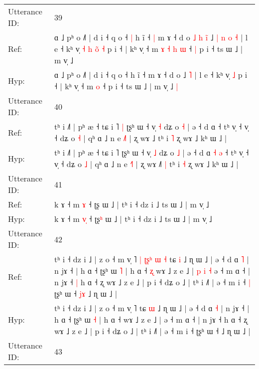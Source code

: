 \documentclass[10pt]{article}
\DeclareRobustCommand{\hl}[1]{{\textcolor{red}{#1}}}
\begin{document}
\begin{longtable}{ll}
 \\
\midrule
Utterance ID: & 39 \\
Ref: & ɑ ˩ pʰ o ˩˥ | d i ˧ q o ˧\hl{ }\hl{|} h ĩ ˧\hl{ }\hl{|} m ɤ ˧ d o\hl{ }\hl{˩}\hl{ }\hl{h}\hl{ }\hl{i}\hl{̃} ˩\hl{ }\hl{|}\hl{ }\hl{n}\hl{ }\hl{o} \hl{˧} | l e ˧ kʰ v̩\hl{ }\hl{˧}\hl{ }\hl{h}\hl{ }\hl{o}\hl{̃} \hl{˧} p i ˧ | kʰ v̩ ˧ m\hl{ }\hl{ɤ}\hl{ }\hl{˧}\hl{ }\hl{h} \hl{ɯ} ˧\hl{ }\hl{|} p i ˧ ts ɯ ˩ | m v̩ ˩\hl{}\hl{}
 \\
Hyp: & ɑ ˩ pʰ o ˩˥ | d i ˧ q o ˧\hl{}\hl{} h ĩ ˧\hl{}\hl{} m ɤ ˧ d o\hl{}\hl{}\hl{}\hl{}\hl{}\hl{}\hl{} ˩\hl{}\hl{}\hl{}\hl{}\hl{}\hl{} \hl{˥} | l e ˧ kʰ v̩\hl{}\hl{}\hl{}\hl{}\hl{}\hl{}\hl{} \hl{˩} p i ˧ | kʰ v̩ ˧ m\hl{}\hl{}\hl{}\hl{}\hl{}\hl{} \hl{o} ˧\hl{}\hl{} p i ˧ ts ɯ ˩ | m v̩ ˩\hl{ }\hl{|}
 \\
\midrule
Utterance ID: & 40 \\
Ref: & tʰ i ˩˥ | pʰ æ ˧ tɕ i ˥\hl{ }\hl{|} ʈʂʰ ɯ ˧ v̩ \hl{˧} dʑ o \hl{˧} | ə ˧ d ɑ\hl{}\hl{}\hl{}\hl{} ˧ tʰ v̩ ˧ v̩ ˧ dʑ o \hl{˧} | qʰ ɑ ˩ n e \hl{˩}˥ | ʐ wɤ ˩\hl{}\hl{}\hl{} tʰ i \hl{˥} ʐ wɤ ˩ kʰ ɯ ˩ |
 \\
Hyp: & tʰ i ˩˥ | pʰ æ ˧ tɕ i ˥\hl{}\hl{} ʈʂʰ ɯ ˧ v̩ \hl{˩} dʑ o \hl{˩} | ə ˧ d ɑ\hl{ }\hl{˧}\hl{ }\hl{ə} ˧ tʰ v̩ ˧ v̩ ˧ dʑ o \hl{˩} | qʰ ɑ ˩ n e \hl{˧}˥ | ʐ wɤ ˩\hl{˥}\hl{ }\hl{|} tʰ i \hl{˧} ʐ wɤ ˩ kʰ ɯ ˩ |
 \\
\midrule
Utterance ID: & 41 \\
Ref: & k ɤ ˧ m \hl{}\hl{ɤ} ˧ ʈʂ\hl{} ɯ ˩ | tʰ i ˧ dz i ˩ ts ɯ ˩ | m v̩ ˩
 \\
Hyp: & k ɤ ˧ m \hl{v}\hl{̩} ˧ ʈʂ\hl{ʰ} ɯ ˩ | tʰ i ˧ dz i ˩ ts ɯ ˩ | m v̩ ˩
 \\
\midrule
Utterance ID: & 42 \\
Ref: & tʰ i ˧ dz i ˩ | z o ˧ m v̩ ˥\hl{ }\hl{|}\hl{ }\hl{ʈ}\hl{ʂ}\hl{ʰ}\hl{ }\hl{ɯ}\hl{ }\hl{˧} tɕ \hl{i} ˩ ɳ ɯ ˩ | ə ˧ d ɑ \hl{˥} | n jɤ ˧ | h ɑ ˧ ʈʂʰ ɯ \hl{˥} | h ɑ ˧\hl{ }\hl{ʐ} wɤ ˩ z e ˩ |\hl{ }\hl{p}\hl{ }\hl{i}\hl{ }\hl{˧} ə ˧ m ɑ ˧ | n jɤ ˧\hl{ }\hl{|} h ɑ ˧ ʐ wɤ ˩ z e ˩ | p i ˧ dʑ o ˩ | tʰ i ˩˥ | ə ˧ m i ˧\hl{ }\hl{|} ʈʂʰ ɯ ˧\hl{ }\hl{j}\hl{ɤ} ˩ ɳ ɯ ˩ |
 \\
Hyp: & tʰ i ˧ dz i ˩ | z o ˧ m v̩ ˥\hl{}\hl{}\hl{}\hl{}\hl{}\hl{}\hl{}\hl{}\hl{}\hl{} tɕ \hl{ɯ} ˩ ɳ ɯ ˩ | ə ˧ d ɑ \hl{˧} | n jɤ ˧ | h ɑ ˧ ʈʂʰ ɯ \hl{˧} | h ɑ ˧\hl{}\hl{} wɤ ˩ z e ˩ |\hl{}\hl{}\hl{}\hl{}\hl{}\hl{} ə ˧ m ɑ ˧ | n jɤ ˧\hl{}\hl{} h ɑ ˧ ʐ wɤ ˩ z e ˩ | p i ˧ dʑ o ˩ | tʰ i ˩˥ | ə ˧ m i ˧\hl{}\hl{} ʈʂʰ ɯ ˧\hl{}\hl{}\hl{} ˩ ɳ ɯ ˩ |
 \\
\midrule
Utterance ID: & 43 \\

\end{longtable}
\end{document}
